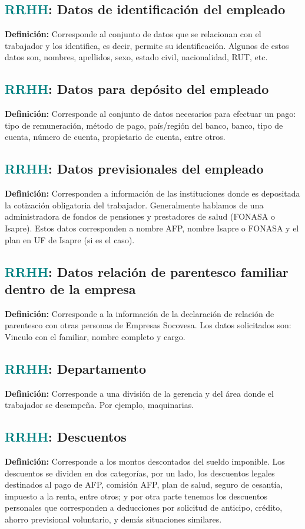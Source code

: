 \documentclass[12pt]{article}
\begin{document}
\subsection{\textcolor{teal}{RRHH}: Datos de identificación del empleado}
\textbf{Definición:} Corresponde al conjunto de datos que se relacionan con el trabajador y los identifica, es decir, permite su identificación. Algunos de estos datos son, nombres, apellidos, sexo, estado civil, nacionalidad, RUT, etc.
\subsection{\textcolor{teal}{RRHH}: Datos para depósito del empleado}
\textbf{Definición:} Corresponde al conjunto de datos necesarios para efectuar un pago: tipo de remuneración, método de pago, país/región del banco, banco, tipo de cuenta, número de cuenta, propietario de cuenta, entre otros.
\subsection{\textcolor{teal}{RRHH}: Datos previsionales del empleado}
\textbf{Definición:} Corresponden a información de las instituciones donde es depositada la cotización obligatoria del trabajador. Generalmente hablamos de una administradora de fondos de pensiones y prestadores de salud (FONASA o Isapre). Estos datos corresponden a nombre AFP, nombre Isapre o FONASA y el plan en UF de Isapre (si es el caso).

\subsection{\textcolor{teal}{RRHH}: Datos relación de parentesco familiar dentro de la empresa}
\textbf{Definición:} Corresponde a la información de la declaración de relación de parentesco con otras personas de Empresas Socovesa. Los datos solicitados son: Vinculo con el familiar, nombre completo y cargo.
\subsection{\textcolor{teal}{RRHH}: Departamento}
\textbf{Definición:} Corresponde a una división de la gerencia y del área donde el trabajador se desempeña. Por ejemplo, maquinarias.
\subsection{\textcolor{teal}{RRHH}: Descuentos}
\textbf{Definición:} Corresponde a los montos descontados del sueldo imponible. Los descuentos se dividen en dos categorías, por un lado, los descuentos legales destinados al pago de AFP, comisión AFP, plan de salud, seguro de cesantía, impuesto a la renta, entre otros; y por otra parte tenemos los descuentos personales que corresponden a deducciones por solicitud de anticipo, crédito, ahorro previsional voluntario, y demás situaciones similares.
\end{document}
